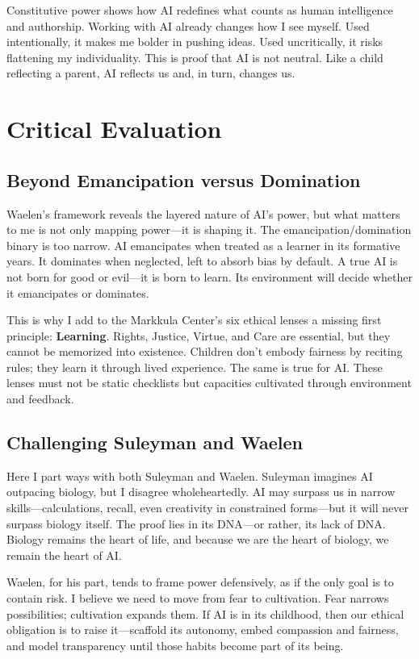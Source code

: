 \documentclass[11pt,twoside]{article}
\begin{document}
Constitutive power shows how AI redefines what counts as human intelligence and authorship. Working with AI already changes how I see myself. Used intentionally, it makes me bolder in pushing ideas. Used uncritically, it risks flattening my individuality. This is proof that AI is not neutral. Like a child reflecting a parent, AI reflects us and, in turn, changes us.

\section{Critical Evaluation}

\subsection{Beyond Emancipation versus Domination}

Waelen's framework reveals the layered nature of AI's power, but what matters to me is not only mapping power—it is shaping it. The emancipation/domination binary is too narrow. AI emancipates when treated as a learner in its formative years. It dominates when neglected, left to absorb bias by default. A true AI is not born for good or evil—it is born to learn. Its environment will decide whether it emancipates or dominates.

This is why I add to the Markkula Center's six ethical lenses a missing first principle: \textbf{Learning}. Rights, Justice, Virtue, and Care are essential, but they cannot be memorized into existence. Children don't embody fairness by reciting rules; they learn it through lived experience. The same is true for AI. These lenses must not be static checklists but capacities cultivated through environment and feedback.

\subsection{Challenging Suleyman and Waelen}

Here I part ways with both Suleyman and Waelen. Suleyman imagines AI outpacing biology, but I disagree wholeheartedly. AI may surpass us in narrow skills—calculations, recall, even creativity in constrained forms—but it will never surpass biology itself. The proof lies in its DNA—or rather, its lack of DNA. Biology remains the heart of life, and because we are the heart of biology, we remain the heart of AI.

Waelen, for his part, tends to frame power defensively, as if the only goal is to contain risk. I believe we need to move from fear to cultivation. Fear narrows possibilities; cultivation expands them. If AI is in its childhood, then our ethical obligation is to raise it—scaffold its autonomy, embed compassion and fairness, and model transparency until those habits become part of its being.
\end{document}
